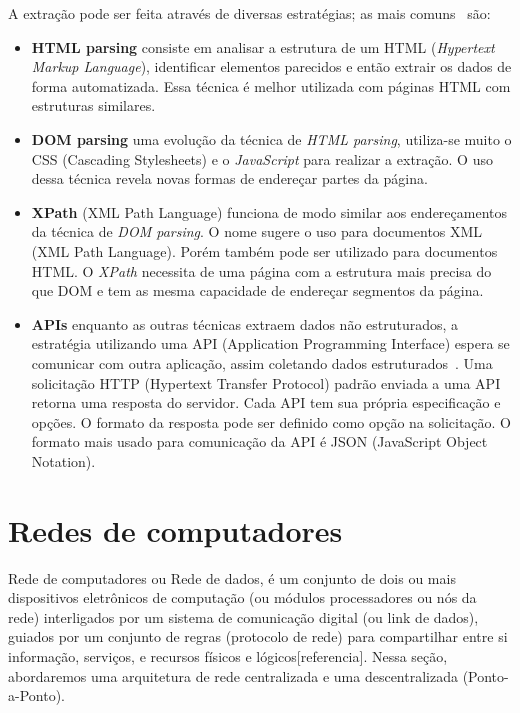 A extração pode ser feita através de diversas estratégias; as mais comuns~\cite{Scraping1} são: 

\begin{itemize}
    \item \textbf{HTML parsing} consiste em analisar a estrutura de um HTML (\textit{Hypertext Markup Language}), identificar elementos parecidos e então extrair os dados de forma automatizada. 
    Essa técnica é melhor utilizada com páginas HTML com estruturas similares.
    \item \textbf{DOM parsing} uma evolução da técnica de \textit{HTML parsing}, utiliza-se muito o CSS (Cascading Stylesheets) e o \textit{JavaScript} para  realizar a extração. O uso dessa técnica revela novas formas de endereçar partes da página.
    \item \textbf{XPath} (XML Path Language) funciona de modo similar aos endereçamentos da técnica de \textit{DOM parsing}.
    O nome sugere o uso para documentos XML (XML Path Language).
    Porém também pode ser utilizado para documentos HTML.
    O \textit{XPath} necessita de uma página com a estrutura mais precisa do que DOM e tem as mesma capacidade de endereçar segmentos da página.
    \item \textbf{APIs} enquanto as outras técnicas extraem dados não estruturados, a estratégia utilizando uma API (Application Programming Interface) espera se comunicar com outra aplicação, assim coletando dados estruturados~\cite{Scraping2}.
    Uma solicitação HTTP (Hypertext Transfer Protocol) padrão enviada a uma API retorna uma resposta do servidor.
    Cada API tem sua própria especificação e opções.
    O formato da resposta pode ser definido como opção na solicitação.
    O formato mais usado para comunicação da API é JSON (JavaScript Object Notation).
\end{itemize}

\section{Redes de computadores}

Rede de computadores ou Rede de dados, é um conjunto de dois ou mais dispositivos eletrônicos de computação (ou módulos processadores ou nós da rede) interligados por um sistema de comunicação digital (ou link de dados), guiados por um conjunto de regras (protocolo de rede) para compartilhar entre si informação, serviços, e recursos físicos e lógicos[referencia].
Nessa seção, abordaremos uma arquitetura de rede centralizada e uma descentralizada (Ponto-a-Ponto).


